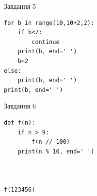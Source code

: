 \documentclass[12pt, ukrainian]{article}
\begin{document}
{\vspace{15mm}
\begin{minipage}[t]{9.7cm}                
{\begin{center}Завдання {5}\end{center}}
\begin{verbatim}
for b in range(10,10+2,2):
    if b<7:
        continue
    print(b, end=' ')
    b=2
else:
    print(b, end=' ')
print(b, end=' ')
\end{verbatim}     
\end{minipage}
\vline \hspace{8mm}
\begin{minipage}[t]{8.0cm}                
{\begin{center}Завдання {6}\end{center}}
\begin{verbatim}
def f(n):
    if n > 9:
        f(n // 100)
    print(n % 10, end=' ')
    


f(123456)
\end{verbatim}     
\end{minipage}

}
\newpage
\end{document}
